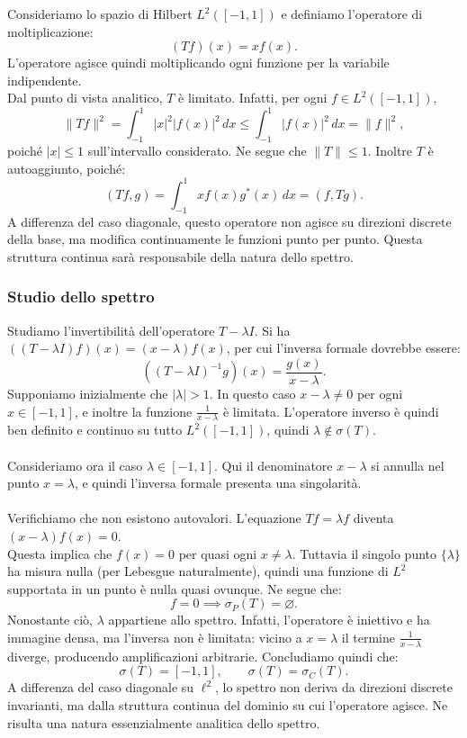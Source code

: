 \documentclass[a4paper,12pt]{report}
\begin{document}
Consideriamo lo spazio di Hilbert $L^2([-1,1])$ e definiamo l’operatore di moltiplicazione:
\[
(Tf)(x)=x f(x).
\]
L’operatore agisce quindi moltiplicando ogni funzione per la variabile indipendente.
\\Dal punto di vista analitico, $T$ è limitato. Infatti, per ogni $f\in L^2([-1,1])$,
\[
\|Tf\|^2
=
\int_{-1}^1 |x|^2 |f(x)|^2\,dx
\le
\int_{-1}^1 |f(x)|^2\,dx
=
\|f\|^2,
\]
poiché $|x|\le1$ sull’intervallo considerato. Ne segue che $\|T\|\le1$. Inoltre $T$ è autoaggiunto, poiché:
\[
(Tf,g)
=
\int_{-1}^1 x f(x) g^*(x)\,dx
=
(f,Tg).
\]
A differenza del caso diagonale, questo operatore non agisce su direzioni discrete della base, ma modifica continuamente le funzioni punto per punto. Questa struttura continua sarà responsabile della natura dello spettro.

\subsubsection{Studio dello spettro}

Studiamo l’invertibilità dell’operatore $T-\lambda I$. Si ha $((T-\lambda I)f)(x)
=
(x-\lambda)f(x)$, per cui l’inversa formale dovrebbe essere:
\[
((T-\lambda I)^{-1}g)(x)
=
\frac{g(x)}{x-\lambda}.
\]
Supponiamo inizialmente che $|\lambda|>1$. In questo caso $x-\lambda\neq0$ per ogni $x\in[-1,1]$, e inoltre la funzione $\frac1{x-\lambda}$ è limitata. L’operatore inverso è quindi ben definito e continuo su tutto $L^2([-1,1])$, quindi $\lambda\notin\sigma(T)$.
\\
\\Consideriamo ora il caso $\lambda\in[-1,1]$. Qui il denominatore $x-\lambda$ si annulla nel punto $x=\lambda$, e quindi l’inversa formale presenta una singolarità.
\\
\\Verifichiamo che non esistono autovalori. L’equazione $Tf=\lambda f$ diventa $(x-\lambda)f(x)=0$.
\\Questa implica che $f(x)=0$ per quasi ogni $x\neq\lambda$. Tuttavia il singolo punto $\{\lambda\}$ ha misura nulla (per Lebesgue naturalmente), quindi una funzione di $L^2$ supportata in un punto è nulla quasi ovunque. Ne segue che:
\[
f=0\implies 
\sigma_P(T)=\varnothing.
\]
Nonostante ciò, $\lambda$ appartiene allo spettro. Infatti, l’operatore è iniettivo e ha immagine densa, ma l’inversa non è limitata: vicino a $x=\lambda$ il termine $\frac1{x-\lambda}$ diverge, producendo amplificazioni arbitrarie. Concludiamo quindi che:
\[
\sigma(T)=[-1,1],
\qquad
\sigma(T)=\sigma_C(T).
\]
A differenza del caso diagonale su $\ell^2$, lo spettro non deriva da direzioni discrete invarianti, ma dalla struttura continua del dominio su cui l’operatore agisce. Ne risulta una natura essenzialmente analitica dello spettro.
\end{document}

